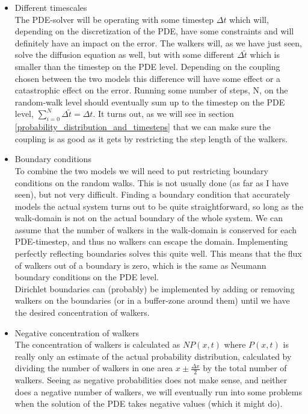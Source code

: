 \begin{itemize}
 \item Different timescales\\
  The PDE-solver will be operating with some timestep $\Delta t$ which will, depending on the discretization of the PDE, have some constraints and will definitely have an impact on the error. 
  The walkers will, as we have just seen, solve the diffusion equation as well, but with some different $\Delta \tilde{t}$ which is smaller than the timestep on the PDE level. 
  Depending on the coupling chosen between the two models this difference will have some effect or a catastrophic effect on the error. 
  Running some number of steps, N, on the random-walk level should eventually sum up to the timestep on the PDE level, $\sum\limits_{i=0}^N \Delta\tilde{t} = \Delta t$. 
  It turns out, as we will see in section \ref{probability_distribution_and_timesteps} that we can make sure the coupling is as good as it gets by restricting the step length of the walkers.
 \item Boundary conditions\\
 To combine the two models we will need to put restricting boundary conditions on the random walks. This is not usually done (as far as I have seen), but not very difficult. 
 Finding a boundary condition that accurately models the actual system turns out to be quite straightforward, so long as the walk-domain is not on the actual boundary of the whole system. 
 We can assume that the number of walkers in the walk-domain is conserved for each PDE-timestep, and thus no walkers can escape the domain. 
 Implementing perfectly reflecting boundaries solves this quite well. 
 This means that the flux of walkers out of a boundary is zero, which is the same as Neumann boundary conditions on the PDE level. \\
 Dirichlet boundaries can (probably) be implemented by adding or removing walkers on the boundaries (or in a buffer-zone around them) until we have the desired concentration of walkers.
 \item Negative concentration of walkers \\
 The concentration of walkers is calculated as $NP(x,t)$ where $P(x,t)$ is really only an estimate of the actual probability distribution, calculated by dividing the number of walkers in one area $x\pm\frac{\Delta x}{2}$ by the total number of walkers. 
 Seeing as negative probabilities does not make sense, and neither does a negative number of walkers, we will eventually run into some problems when the solution of the PDE takes negative values (which it might do). 

\end{itemize}
